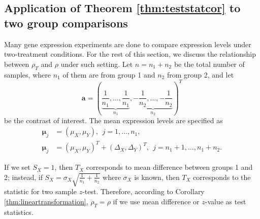\documentclass[12pt, a4paper]{article}
\begin{document}
	\subsection{Application of Theorem \ref{thm:teststatcor} to two group comparisons}
	
	Many gene expression experiments are done to compare expression levels under two-treatment conditions. For the rest of this section, we discuss the relationship between $\rho_T$ and $\rho$ under such setting.
	Let $n = n_1 + n_2$ be the total number of samples, where $n_1$ of them are from group 1 and 
	$n_2$ from group 2, and let
	\begin{equation}\label{eq:contrast}
	\bm a  = (\underbrace{\frac{1}{n_1}, \ldots, \frac{1}{n_1}}_{n_1}, \underbrace{-\frac{1}{n_2}, \ldots, -\frac{1}{n_2}}_{n_2})^T
	\end{equation}
	be the contrast of interest. 
	 The mean expression levels are specified as 
	 \begin{equation}\label{eq:meanTwogroup}
	 \begin{aligned}
	 \bm \mu_j &= (\mu_X, \mu_Y),~~ j = 1, \ldots, n_1, \\
	 \bm \mu_j &= (\mu_X,  \mu_Y)^T  + ( \Delta_X,\Delta_Y)^T, ~~j = n_1 + 1, \ldots, n_1 + n_2.
	 \end{aligned}
	 \end{equation}
	 
	 
	If we set $S_X=1$, then $T_X$ corresponds to mean difference between groups 1 and 2; instead, 
	if $S_X = \sigma_X\sqrt{\frac{1}{n_1} + \frac{1}{n_2}}$ where $\sigma_X$ is known, then $T_X$ 
	corresponds to the statistic for two sample $z$-test. Therefore, according to Corollary 
	\ref{thm:lineartransformation},  $\rho_T=\rho$ if we use mean difference or $z$-value as test 
	statistics.
	
\end{document}
